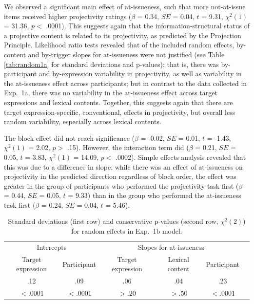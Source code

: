 \documentclass[11pt,fleqn]{article}
\newcommand{\6}{\mbox{$[\hspace*{-.6mm}[$}}
\newcommand{\9}{\mbox{$]\hspace*{-.6mm}]$}}
\newcommand{\tableref}[1]{Table \ref{#1}}
\begin{document}
We observed a significant main effect of at-issueness, such that more not-at-issue items received higher projectivity ratings ($\beta$ = 0.34, $SE$ = 0.04, $t$ = 9.31, $\chi^2(1)$ = 31.36, $p <$ .0001). This suggests again that the information-structural status of a projective content is related to its projectivity, as predicted by the Projection Principle. Likelihood ratio tests revealed that of the included random effects, by-content and by-trigger slopes for at-issueness were not justified (see \tableref{tab:random1a} for standard deviations and p-values); that is, there was by-participant and by-expression variability in projectivity, as well as variability in the at-issueness effect across participants; but in contrast to the data collected in Exp.~1a, there was no variability in the at-issueness effect across target expressions and lexical contents. Together, this suggests again that there are target expression-specific, conventional, effects in projectivity, but overall less random variability, especially across lexical contents. 

The block effect did not reach significance ($\beta$ = -0.02, $SE$ = 0.01, $t$ = -1.43, $\chi^2(1)$ = 2.02, $p >$ .15). However, the interaction term did ($\beta$ = 0.21, $SE$ = 0.05, $t$ = 3.83, $\chi^2(1)$ = 14.09, $p <$ .0002). Simple effects analysis revealed that this was due to a difference in slope: while there was an effect of at-issueness on projectivity in the predicted direction regardless of block order, the effect was greater in the group of participants who performed the projectivity task first ($\beta$ = 0.44, $SE$ = 0.05, $t$ = 9.33) than in the group who performed the at-issueness task first ($\beta$ = 0.24, $SE$ = 0.04, $t$ = 5.46).


\begin{table}
\caption{Standard deviations (first row) and conservative p-values (second row, $\chi^2(2)$) for random effects in Exp.~1b model.}
\begin{tabular}{c c c c c c }
\toprule
\multicolumn{2}{c}{Intercepts} & \multicolumn{3}{c}{Slopes for at-issueness}\\
Target expression & Participant & Target expression & Lexical content & Participant\\
\midrule
.12 & .09 & .06 & .04 & .23\\
$< .0001$ & $< .0001$ & $> .20$ & $> .50$ & $< .0001$ \\
\bottomrule
\end{tabular}
\label{tab:random1b}
\end{table}
\end{document}
